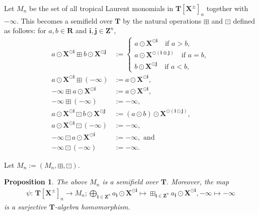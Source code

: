 \documentclass[a4paper,12pt]{amsart}
\newtheorem{prop}[dfn]{Proposition}
\begin{document}
Let $M_n$ be the set of all tropical Laurent monomials in $\boldsymbol{T}[\boldsymbol{X}^{\pm}]_n$ together with $-\infty$.
This becomes a semifield over $\boldsymbol{T}$ by the natural operations $\boxplus$ and $\boxdot$ defined as follows:
for $a, b \in \boldsymbol{R}$ and $\boldsymbol{i}, \boldsymbol{j} \in \boldsymbol{Z}^n$,
\begin{align*}
a \odot \boldsymbol{X}^{\odot \boldsymbol{i}} \boxplus b \odot \boldsymbol{X}^{\odot \boldsymbol{j}} &:= \begin{cases}
a \odot \boldsymbol{X}^{\odot \boldsymbol{i}} \quad \text{if }a > b,\\
a \odot \boldsymbol{X}^{\odot (\boldsymbol{i} \oplus \boldsymbol{j})} \quad \text{if }a = b,\\
b \odot \boldsymbol{X}^{\odot \boldsymbol{j}} \quad \text{if }a < b,
\end{cases}\\
a \odot \boldsymbol{X}^{\odot \boldsymbol{i}} \boxplus (-\infty) &:= a \odot \boldsymbol{X}^{\odot \boldsymbol{i}},\\
- \infty \boxplus a \odot \boldsymbol{X}^{\odot \boldsymbol{i}} &:= a \odot \boldsymbol{X}^{\odot \boldsymbol{i}},\\
- \infty \boxplus (-\infty) &:= -\infty,\\
a \odot \boldsymbol{X}^{\odot \boldsymbol{i}} \boxdot b \odot \boldsymbol{X}^{\odot \boldsymbol{j}} &:= (a \odot b) \odot \boldsymbol{X}^{\odot (\boldsymbol{i} \odot \boldsymbol{j})},\\
a \odot \boldsymbol{X}^{\odot \boldsymbol{i}} \boxdot (- \infty) &:= -\infty,\\
-\infty \boxdot a \odot \boldsymbol{X}^{\odot \boldsymbol{i}} &:= -\infty, \text{ and}\\
-\infty \boxdot (-\infty) &:= -\infty.
\end{align*}

Let $M_n := (M_n, \boxplus, \boxdot)$.

\begin{prop}
    \label{prop4-6-1}
The above $M_n$ is a semifield over $\boldsymbol{T}$.
Moreover, the map
\begin{align*}
\psi :\, \boldsymbol{T}[\boldsymbol{X}^{\pm}]_n \to M_n;
\bigoplus_{\boldsymbol{i} \in \boldsymbol{Z}^n} a_{\boldsymbol{i}} \odot \boldsymbol{X}^{\odot \boldsymbol{i}} \mapsto \boxplus_{\boldsymbol{i} \in \boldsymbol{Z}^n} a_{\boldsymbol{i}} \odot \boldsymbol{X}^{\odot \boldsymbol{i}},
-\infty \mapsto -\infty
\end{align*}
is a surjective $\boldsymbol{T}$-algebra homomorphism.
\end{prop}
\end{document}
